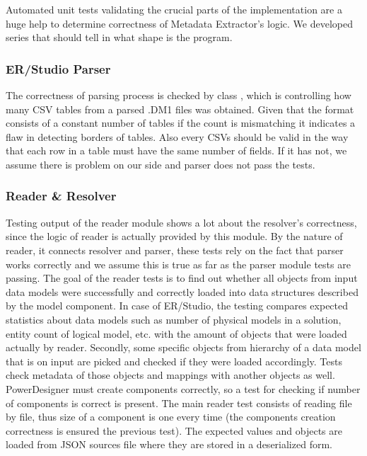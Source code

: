 Automated unit tests validating the crucial parts of the implementation are a huge help to determine correctness of Metadata Extractor's logic. 
We developed series that should tell in what shape is the program.

\subsubsection{ER/Studio Parser}

The correctness of parsing process is checked by class , which is controlling how many CSV tables from a parsed .DM1 files was obtained. Given that the format consists of a constant number of tables if the count is mismatching it indicates a flaw in detecting borders of tables.
Also every CSVs should be valid in the way that each row in a table must have the same number of fields. If it has not, we assume there is problem on our side and parser does not pass the tests.

\subsubsection{Reader \& Resolver}

Testing output of the reader module shows a lot about the resolver's correctness, since the logic of reader is actually provided by this module. 
By the nature of reader, it connects resolver and parser, these tests rely on the fact that parser works correctly and we assume this is true as far as the parser module tests are passing.
The goal of the reader tests is to find out whether all objects from input data models were successfully and correctly loaded into data structures described by the model component.
In case of ER/Studio, the testing compares expected statistics about data models such as number of physical models in a solution, entity count of logical model, etc. with the amount of objects that were loaded actually by reader.
Secondly, some specific objects from hierarchy of a data model that is on input are picked and checked if they were loaded accordingly. Tests check metadata of those objects and mappings with another objects as well. \\ 

PowerDesigner must create components correctly, so a test for checking if number of components is correct is present.
The main reader test consists of reading file by file, thus size of a component is one every time (the components creation correctness is ensured the previous test).
The expected values and objects are loaded from JSON sources file where they are stored in a deserialized form.

